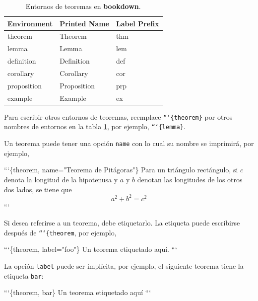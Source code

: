 \documentclass[12pt,]{krantz}
\makeatletter
\newenvironment{Shaded}{\begin{snugshade}}{\end{snugshade}}
\newcommand{\NormalTok}[1]{{#1}}
\newenvironment{kframe}{%
\medskip{}
\setlength{\fboxsep}{.8em}
 \def\at@end@of@kframe{}%
 \ifinner\ifhmode%
  \def\at@end@of@kframe{\end{minipage}}%
  \begin{minipage}{\columnwidth}%
 \fi\fi%
 \def\FrameCommand##1{\hskip\@totalleftmargin \hskip-\fboxsep
 \colorbox{shadecolor}{##1}\hskip-\fboxsep
     \hskip-\linewidth \hskip-\@totalleftmargin \hskip\columnwidth}%
 \MakeFramed {\advance\hsize-\width
   \@totalleftmargin\z@ \linewidth\hsize
   \@setminipage}}%
 {\par\unskip\endMakeFramed%
 \at@end@of@kframe}
\renewenvironment{Shaded}{\begin{kframe}}{\end{kframe}}
\theoremstyle{definition}
\theoremstyle{definition}
\theoremstyle{remark}
\makeatother
\begin{document}
\begin{table}

\caption{\label{tab:theorem-envs}Entornos de teoremas en \textbf{bookdown}.}
\centering
\begin{tabular}[t]{lll}
\toprule
Environment & Printed Name & Label Prefix\\
\midrule
theorem & Theorem & thm\\
lemma & Lemma & lem\\
definition & Definition & def\\
corollary & Corollary & cor\\
proposition & Proposition & prp\\
example & Example & ex\\
\bottomrule
\end{tabular}
\end{table}

Para escribir otros entornos de teoremas, reemplace
\texttt{```\{theorem\}} por otros nombres de entornos en la tabla
\ref{tab:theorem-envs}, por ejemplo, \texttt{```\{lemma\}}.

Un teorema puede tener una opción \texttt{name} con lo cual su nombre se
imprimirá, por ejemplo,

\begin{Shaded}
\begin{Highlighting}[]
\NormalTok{```\{theorem, name="Teorema de Pitágoras"\}}
\NormalTok{Para un triángulo rectángulo, si $c$ denota la longitud de la hipotenusa}
\NormalTok{y $a$ y $b$ denotan las longitudes de los otros dos lados, se tiene que}
\NormalTok{$$a^2 + b^2 = c^2$$}
\NormalTok{```}
\end{Highlighting}
\end{Shaded}

Si desea referirse a un teorema, debe etiquetarlo. La etiqueta puede
escribirse después de \texttt{```\{theorem}, por ejemplo,

\begin{Shaded}
\begin{Highlighting}[]
\NormalTok{```\{theorem, label="foo"\}}
\NormalTok{Un teorema etiquetado aquí.}
\NormalTok{```}
\end{Highlighting}
\end{Shaded}

La opción \texttt{label} puede ser implícita, por ejemplo, el siguiente
teorema tiene la etiqueta \texttt{bar}:

\begin{Shaded}
\begin{Highlighting}[]
\NormalTok{```\{theorem, bar\}}
\NormalTok{Un teorema etiquetado aquí}
\NormalTok{```}
\end{Highlighting}
\end{Shaded}
\end{document}

